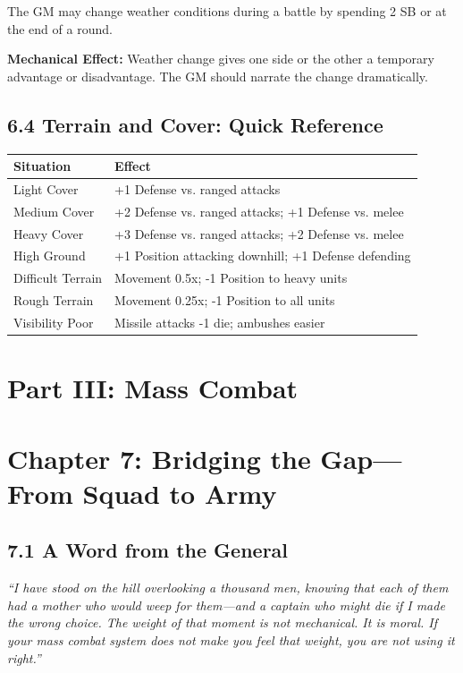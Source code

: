 \documentclass[11pt]{article}
\begin{document}
The GM may change weather conditions during a battle by spending 2 SB or at the end of a round.

\textbf{Mechanical Effect:} Weather change gives one side or the other a temporary advantage or disadvantage. The GM should narrate the change dramatically.

\subsection{6.4 Terrain and Cover: Quick Reference}

\begin{tabular}{|l|l|}
\hline
Situation & Effect \\
\hline
Light Cover & +1 Defense vs. ranged attacks \\
\hline
Medium Cover & +2 Defense vs. ranged attacks; +1 Defense vs. melee \\
\hline
Heavy Cover & +3 Defense vs. ranged attacks; +2 Defense vs. melee \\
\hline
High Ground & +1 Position attacking downhill; +1 Defense defending \\
\hline
Difficult Terrain & Movement 0.5x; -1 Position to heavy units \\
\hline
Rough Terrain & Movement 0.25x; -1 Position to all units \\
\hline
Visibility Poor & Missile attacks -1 die; ambushes easier \\
\hline
\end{tabular}

\section{Part III: Mass Combat}

\section{Chapter 7: Bridging the Gap—From Squad to Army}

\subsection{7.1 A Word from the General}

\textit{``I have stood on the hill overlooking a thousand men, knowing that each of them had a mother who would weep for them—and a captain who might die if I made the wrong choice. The weight of that moment is not mechanical. It is moral. If your mass combat system does not make you feel that weight, you are not using it right.''}
\end{document}
